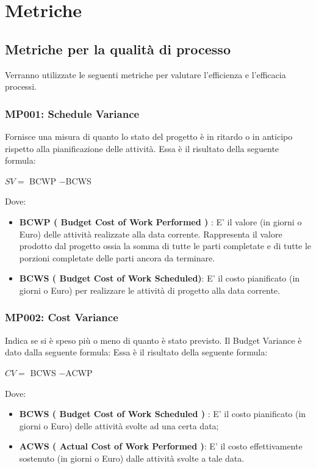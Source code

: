 \chapter{Metriche}
\section{Metriche per la qualità di processo}\label{processo}
Verranno utilizzate le seguenti metriche per valutare l'efficienza e l'efficacia 
processi.

\subsection{MP001: Schedule Variance}
Fornisce una misura di quanto lo stato del progetto è in ritardo o in anticipo rispetto alla pianificazione delle attività.
Essa è il risultato della seguente formula:\\
\begin{center}
	$SV = ${ BCWP} $-${BCWS}
\end{center}
Dove:
\begin{itemize}
		\item \textbf{ BCWP ( Budget Cost of Work Performed ) } : E' il valore (in giorni o Euro) delle attività realizzate alla data corrente. Rappresenta il valore prodotto dal progetto ossia la somma di tutte le parti completate e di tutte le porzioni completate delle parti ancora da terminare.
		\item \textbf{ BCWS ( Budget Cost of Work Scheduled)}: E' il costo pianificato (in giorni o Euro) per realizzare le attività di progetto alla data corrente.
\end{itemize}

\subsection{MP002: Cost  Variance }
Indica se si è speso più o meno di quanto è stato previsto.
Il Budget Variance è dato dalla seguente formula:
Essa è il risultato della seguente formula:\\
\begin{center}
	$CV = ${ BCWS} $-${ACWP}
\end{center}
Dove:
\begin{itemize}
	\item \textbf{ BCWS ( Budget Cost of Work Scheduled ) } : E' il costo pianificato (in giorni o Euro) delle attività svolte ad una certa data; 
	\item \textbf{ ACWS ( Actual Cost of Work Performed )}: E' il costo effettivamente sostenuto (in giorni o Euro) dalle attività svolte a tale data.
\end{itemize}

